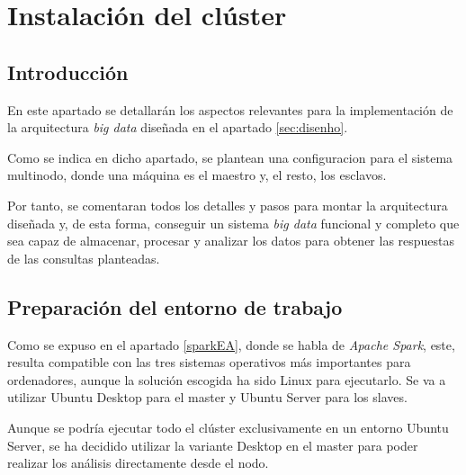 \chapter{Instalación del clúster \label{sec:implementacion}}

\section{Introducción}
En este apartado se detallarán los aspectos relevantes para la implementación de la arquitectura \textit{big data} diseñada en el apartado \ref{sec:disenho}.

Como se indica en dicho apartado, se plantean una configuracion para el sistema multinodo, donde una máquina es el maestro y, el resto, los esclavos.

Por tanto, se comentaran todos los detalles y pasos para montar la arquitectura diseñada y, de esta forma, conseguir un sistema \textit{big data} funcional y completo que sea capaz de almacenar, procesar y analizar los datos para obtener las respuestas de las consultas planteadas.

\section{Preparación del entorno de trabajo}
Como se expuso en el apartado \ref{sparkEA}, donde se habla de \textit{Apache Spark}, este, resulta compatible con las tres sistemas operativos más importantes para ordenadores, aunque la solución escogida ha sido Linux para ejecutarlo. Se va a utilizar Ubuntu Desktop \cite{ubuntu} para el master y Ubuntu Server para los slaves. 

Aunque se podría ejecutar todo el clúster exclusivamente en un entorno Ubuntu Server, se ha decidido utilizar la variante Desktop en el master para poder realizar los análisis directamente desde el nodo.

